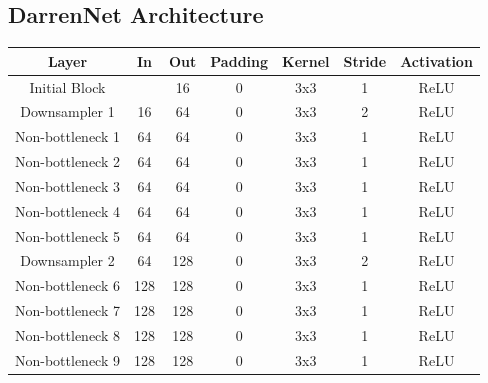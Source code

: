\subsection*{DarrenNet Architecture}
\begin{table}[H]
	\centering
	\label{tab:darrenyu}
	\setlength{\abovecaptionskip}{10pt}
	\begin{tabular}{|c|c|c|c|c|c|c|}
		\hline
		\textbf{Layer}    & \textbf{In} & \textbf{Out} & \textbf{Padding} & \textbf{Kernel} & \textbf{Stride} & \textbf{Activation} \\ \hline
		Initial Block     &             & 16           & 0                & 3x3             & 1               & ReLU                \\ \hline
		Downsampler 1     & 16          & 64           & 0                & 3x3             & 2               & ReLU                \\ \hline
		Non-bottleneck 1  & 64          & 64           & 0                & 3x3             & 1               & ReLU                \\ \hline
		Non-bottleneck 2  & 64          & 64           & 0                & 3x3             & 1               & ReLU                \\ \hline
		Non-bottleneck 3  & 64          & 64           & 0                & 3x3             & 1               & ReLU                \\ \hline
		Non-bottleneck 4  & 64          & 64           & 0                & 3x3             & 1               & ReLU                \\ \hline
		Non-bottleneck 5  & 64          & 64           & 0                & 3x3             & 1               & ReLU                \\ \hline
		Downsampler 2     & 64          & 128          & 0                & 3x3             & 2               & ReLU                \\ \hline
		Non-bottleneck 6  & 128         & 128          & 0                & 3x3             & 1               & ReLU                \\ \hline
		Non-bottleneck 7  & 128         & 128          & 0                & 3x3             & 1               & ReLU                \\ \hline
		Non-bottleneck 8  & 128         & 128          & 0                & 3x3             & 1               & ReLU                \\ \hline
		Non-bottleneck 9  & 128         & 128          & 0                & 3x3             & 1               & ReLU                \\ \hline

\end{tabular}
\end{table}
